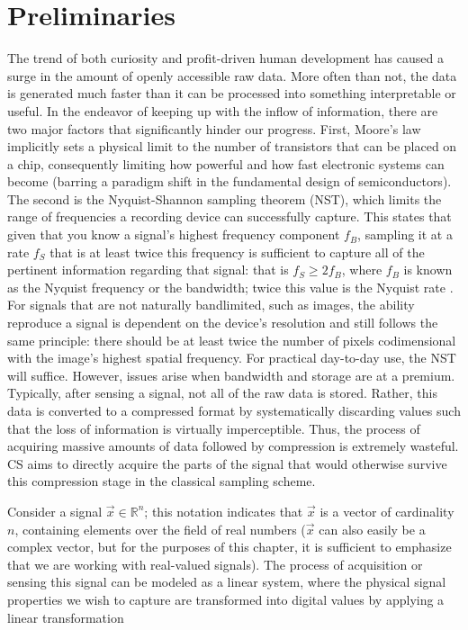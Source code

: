 \chapter{Preliminaries}
\label{chap:theory}

The trend of both curiosity and profit-driven human development has caused a
surge in the amount of openly accessible raw data. More often than not, the data is generated much faster than it can be processed into something interpretable or useful. In the endeavor of keeping up with the inflow of information, there are two major factors that significantly hinder our progress. First, Moore’s law implicitly sets a physical limit to the number of transistors that can be placed on a chip, consequently limiting how powerful and how fast electronic systems can become (barring a paradigm shift in the fundamental design of semiconductors). The second is the Nyquist-Shannon sampling theorem (NST), which limits the range of frequencies a recording device can successfully capture. This states that given that you know a signal's highest frequency component $f_B$, sampling it at a rate $f_S$ that is at least twice this frequency is sufficient to capture all of the pertinent information regarding that signal: that is $f_S \geq 2f_B$, where $f_B$ is known as the Nyquist frequency or the bandwidth; twice this value is the Nyquist rate \cite{Shannon1949}. For signals that are not naturally bandlimited, such as images, the ability reproduce a signal is dependent on the device's resolution and still follows the same principle: there should be at least twice the number of pixels codimensional with the image's highest spatial frequency. For practical day-to-day use, the NST will suffice. However, issues arise when bandwidth and storage are at a premium. Typically, after sensing a signal, not all of the raw data is stored. Rather, this data is converted to a compressed format by systematically discarding values such that the loss of information is virtually imperceptible. Thus, the process of acquiring massive amounts of data followed by compression is extremely wasteful. CS aims to directly acquire the parts of the signal that would otherwise survive this compression stage in the classical sampling scheme.

Consider a signal $\vec{x} \in \mathbb{R}^{n}$; this notation indicates that $\vec{x}$ is a vector of cardinality $n$, containing elements over the field of real numbers ($\vec{x}$ can also easily be a complex vector, but for the purposes of this chapter, it is sufficient to emphasize that we are working with real-valued signals). The process of acquisition or sensing this signal can be modeled as a linear system, where the physical signal properties we wish to capture are transformed into digital values by applying a linear transformation

